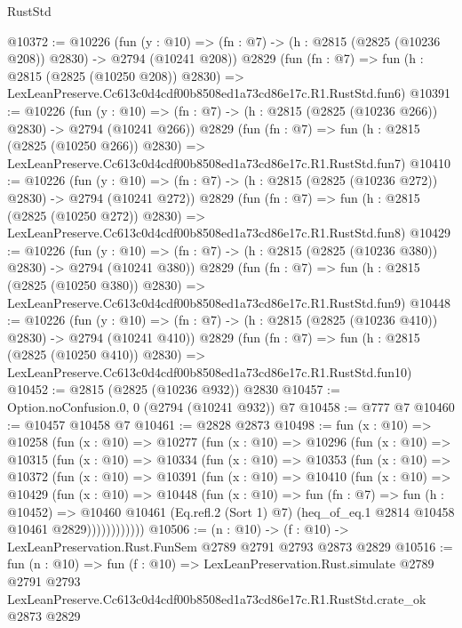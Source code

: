 \begin{lexlean}{RustStd}
\begin{coremodule}
@10372 := @10226
    (fun (y : @10) => (fn : @7) -> (h : @2815 (@2825 (@10236 @208)) @2830) -> @2794 (@10241 @208))
    @2829
    (fun (fn : @7) =>
    fun (h : @2815 (@2825 (@10250 @208)) @2830) =>
    LexLeanPreserve.Cc613c0d4cdf00b8508ed1a73cd86e17c.R1.RustStd.fun6)
@10391 := @10226
    (fun (y : @10) => (fn : @7) -> (h : @2815 (@2825 (@10236 @266)) @2830) -> @2794 (@10241 @266))
    @2829
    (fun (fn : @7) =>
    fun (h : @2815 (@2825 (@10250 @266)) @2830) =>
    LexLeanPreserve.Cc613c0d4cdf00b8508ed1a73cd86e17c.R1.RustStd.fun7)
@10410 := @10226
    (fun (y : @10) => (fn : @7) -> (h : @2815 (@2825 (@10236 @272)) @2830) -> @2794 (@10241 @272))
    @2829
    (fun (fn : @7) =>
    fun (h : @2815 (@2825 (@10250 @272)) @2830) =>
    LexLeanPreserve.Cc613c0d4cdf00b8508ed1a73cd86e17c.R1.RustStd.fun8)
@10429 := @10226
    (fun (y : @10) => (fn : @7) -> (h : @2815 (@2825 (@10236 @380)) @2830) -> @2794 (@10241 @380))
    @2829
    (fun (fn : @7) =>
    fun (h : @2815 (@2825 (@10250 @380)) @2830) =>
    LexLeanPreserve.Cc613c0d4cdf00b8508ed1a73cd86e17c.R1.RustStd.fun9)
@10448 := @10226
    (fun (y : @10) => (fn : @7) -> (h : @2815 (@2825 (@10236 @410)) @2830) -> @2794 (@10241 @410))
    @2829
    (fun (fn : @7) =>
    fun (h : @2815 (@2825 (@10250 @410)) @2830) =>
    LexLeanPreserve.Cc613c0d4cdf00b8508ed1a73cd86e17c.R1.RustStd.fun10)
@10452 := @2815 (@2825 (@10236 @932)) @2830
@10457 := Option.noConfusion.{0, 0} (@2794 (@10241 @932)) @7
@10458 := @777 @7
@10460 := @10457 @10458 @7
@10461 := @2828 @2873
@10498 := fun (x : @10) =>
  @10258
    (fun (x : @10) =>
    @10277
      (fun (x : @10) =>
      @10296
        (fun (x : @10) =>
        @10315
          (fun (x : @10) =>
          @10334
            (fun (x : @10) =>
            @10353
              (fun (x : @10) =>
              @10372
                (fun (x : @10) =>
                @10391
                  (fun (x : @10) =>
                  @10410
                    (fun (x : @10) =>
                    @10429
                      (fun (x : @10) =>
                      @10448
                        (fun (x : @10) =>
                        fun (fn : @7) =>
                        fun (h : @10452) =>
                        @10460
                          @10461
                          (Eq.refl.{2} (Sort 1) @7)
                          (heq_of_eq.{1} @2814 @10458 @10461 @2829))))))))))))
@10506 := (n : @10) -> (f : @10) -> LexLeanPreservation.Rust.FunSem @2789 @2791 @2793 @2873 @2829
@10516 := fun (n : @10) =>
  fun (f : @10) =>
  LexLeanPreservation.Rust.simulate
    @2789
    @2791
    @2793
    LexLeanPreserve.Cc613c0d4cdf00b8508ed1a73cd86e17c.R1.RustStd.crate_ok
    @2873
    @2829
\end{coremodule}
\end{lexlean}

